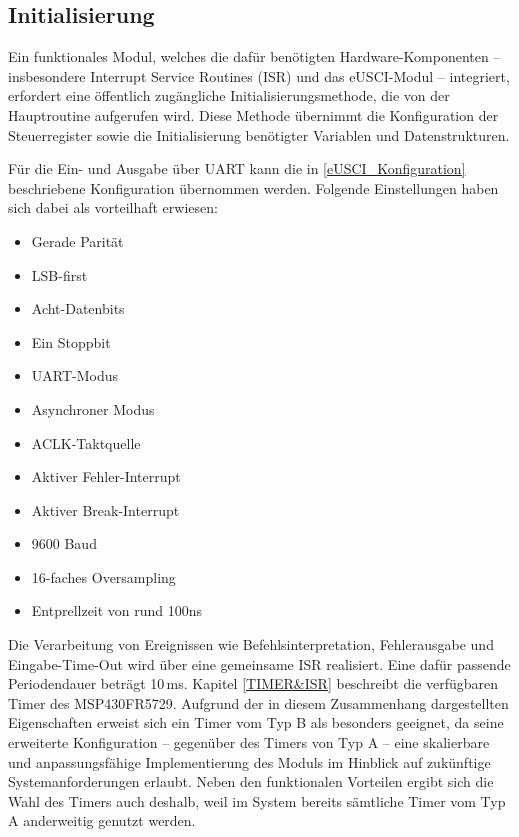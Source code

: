 
\newpage
\subsection{Initialisierung}
\label{Init}

Ein funktionales Modul, welches die daf\"ur ben\"otigten Hardware-Komponenten – insbesondere Interrupt Service Routines (ISR) und das eUSCI-Modul – integriert, erfordert eine \"offentlich zug\"angliche Initialisierungsmethode, die von der Hauptroutine aufgerufen wird. Diese Methode \"ubernimmt die Konfiguration der Steuerregister sowie die Initialisierung ben\"otigter Variablen und Datenstrukturen.

F\"ur die Ein- und Ausgabe \"uber UART kann die in \ref{eUSCI_Konfiguration} beschriebene Konfiguration \"ubernommen werden. Folgende Einstellungen haben sich dabei als vorteilhaft erwiesen:

\begin{itemize}
	\item Gerade Parit\"at
	\item LSB-first
	\item Acht-Datenbits
	\item Ein Stoppbit
	\item UART-Modus
	\item Asynchroner Modus
	\item ACLK-Taktquelle
	\item Aktiver Fehler-Interrupt
	\item Aktiver Break-Interrupt
	\item 9600 Baud
	\item 16-faches Oversampling
	\item Entprellzeit von rund 100ns
\end{itemize}

Die Verarbeitung von Ereignissen wie Befehlsinterpretation, Fehlerausgabe und Eingabe-Time-Out wird \"uber eine gemeinsame ISR realisiert. Eine daf\"ur passende Periodendauer betr\"agt 10\,ms. Kapitel \ref{TIMER&ISR} beschreibt die verf\"ugbaren Timer des MSP430FR5729. Aufgrund der in diesem Zusammenhang dargestellten Eigenschaften erweist sich ein Timer vom Typ B als besonders geeignet, da seine erweiterte Konfiguration -- gegen\"uber des Timers von Typ A -- eine skalierbare und anpassungsf\"ahige Implementierung des Moduls im Hinblick auf zuk\"unftige Systemanforderungen erlaubt. Neben den funktionalen Vorteilen ergibt sich die Wahl des Timers auch deshalb, weil im System bereits s\"amtliche Timer vom Typ A anderweitig genutzt werden.

